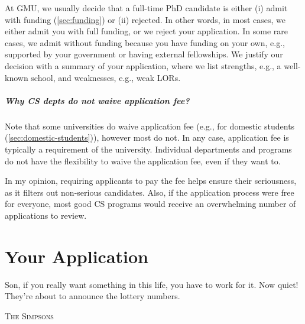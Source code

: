 \documentclass[oneside,11pt,dvipsnames]{book}
\newenvironment{commentbox}[1][]{
  \small
  \begin{mybox}
    {\small \textbf{#1}}
  }{
  \end{mybox}
}
\newcommand{\mycomment}[3][\color{blue}]{{#1{{#2}: {#3}}}}
\newcommand{\didi}[1]{\mycomment{Didier}{#1}}{}
\begin{document}
At GMU, we usually decide that a full-time PhD candidate is either (i) admit with funding (\autoref{sec:funding}) or (ii) rejected. In other words, in most cases, we either
admit you with full funding, or we reject your application. In some rare cases, we admit
without funding because you have funding on your own, e.g.,
supported by your government or having external fellowships. We justify
our decision with a summary of your application, where we list
strengths, e.g., a well-known school, and weaknesses, e.g., weak
LORs.



\paragraph{Why CS depts do not waive application fee?}  Note that some universities do waive application fee (e.g., for domestic students (\autoref{sec:domestic-students})), however most do not.  In any case, application fee is typically a requirement of the university. Individual departments and programs do not have the flexibility to waive the application fee, even if they want to.

In my opinion, requiring applicants to pay the fee helps ensure their seriousness, as it filters out non-serious candidates. Also, if the application process were free for everyone, most good CS programs would receive an overwhelming number of applications to review.




\chapter{Your Application}\label{sec:application}

\epigraph{Son, if you really want something in this life, you have to work for it. Now quiet! They’re about to announce the lottery numbers.}{\textsc{The Simpsons}}
\end{document}
